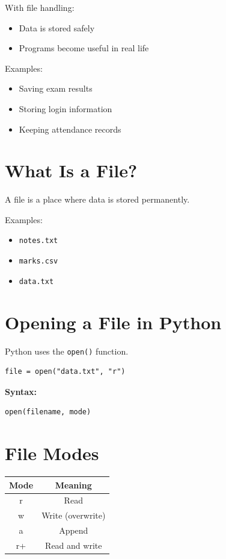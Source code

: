 With file handling:
\begin{itemize}
    \item Data is stored safely
    \item Programs become useful in real life
\end{itemize}

Examples:
\begin{itemize}
    \item Saving exam results
    \item Storing login information
    \item Keeping attendance records
\end{itemize}

\section{What Is a File?}

A file is a place where data is stored permanently.

Examples:
\begin{itemize}
    \item \texttt{notes.txt}
    \item \texttt{marks.csv}
    \item \texttt{data.txt}
\end{itemize}

\section{Opening a File in Python}

Python uses the \texttt{open()} function.

\begin{verbatim}
file = open("data.txt", "r")
\end{verbatim}

\textbf{Syntax:}
\begin{verbatim}
open(filename, mode)
\end{verbatim}

\section{File Modes}

\begin{center}
\begin{tabular}{|c|c|}
\hline
\textbf{Mode} & \textbf{Meaning} \\
\hline
r & Read \\
w & Write (overwrite) \\
a & Append \\
r+ & Read and write \\
\hline
\end{tabular}
\end{center}

